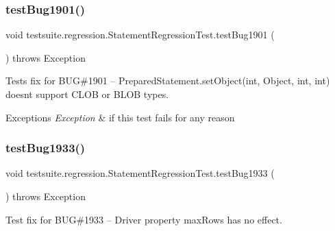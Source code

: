 \subsubsection{\texorpdfstring{test\+Bug1901()}{testBug1901()}}
{\footnotesize\ttfamily void testsuite.\+regression.\+Statement\+Regression\+Test.\+test\+Bug1901 (\begin{DoxyParamCaption}{ }\end{DoxyParamCaption}) throws Exception}

Tests fix for B\+UG\#1901 -- Prepared\+Statement.\+set\+Object(int, Object, int, int) doesn\textquotesingle{}t support C\+L\+OB or B\+L\+OB types.


\begin{DoxyExceptions}{Exceptions}
{\em Exception} & if this test fails for any reason \\
\hline
\end{DoxyExceptions}
\mbox{\label{classtestsuite_1_1regression_1_1_statement_regression_test_a61d09502580908ecb2e973f8f3f22d51}} 
\subsubsection{\texorpdfstring{test\+Bug1933()}{testBug1933()}}
{\footnotesize\ttfamily void testsuite.\+regression.\+Statement\+Regression\+Test.\+test\+Bug1933 (\begin{DoxyParamCaption}{ }\end{DoxyParamCaption}) throws Exception}

Test fix for B\+UG\#1933 -- Driver property \textquotesingle{}max\+Rows\textquotesingle{} has no effect.


